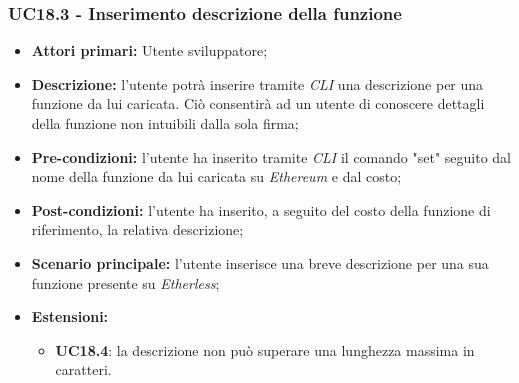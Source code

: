 \subsubsection{UC18.3 - Inserimento descrizione della funzione}
\begin{itemize}
	\item \textbf{Attori primari:} Utente sviluppatore;
	\item \textbf{Descrizione:} l'utente potrà inserire tramite \textit{CLI\glo} una descrizione per una funzione da lui caricata. Ciò consentirà ad un utente di conoscere dettagli della funzione non intuibili dalla sola firma;
	\item \textbf{Pre-condizioni:} l'utente ha inserito tramite \textit{CLI\glo} il comando "set" seguito dal nome della funzione da lui caricata su \textit{Ethereum\glo} e dal costo;
	\item \textbf{Post-condizioni:} l'utente ha inserito, a seguito del costo della funzione di riferimento, la relativa descrizione;
	\item \textbf{Scenario principale:} l'utente inserisce una breve descrizione per una sua funzione presente su \textit{Etherless};
	\item \textbf{Estensioni:}
	\begin{itemize}
		\item \textbf{UC18.4}: la descrizione non può superare una lunghezza massima in caratteri.
	\end{itemize}
\end{itemize}
